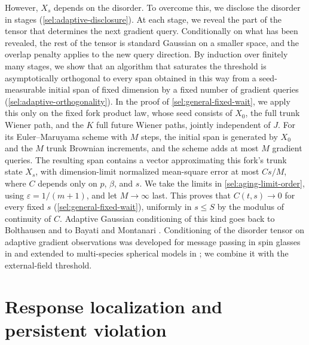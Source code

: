 However, $X_s$ depends on the disorder. To overcome this, we disclose the disorder in stages (\cref{sel:adaptive-disclosure}). At each stage, we reveal the part of the tensor that determines the next gradient query. Conditionally on what has been revealed, the rest of the tensor is standard Gaussian on a smaller space, and the overlap penalty applies to the new query direction. By induction over finitely many stages, we show that an algorithm that saturates the threshold is asymptotically orthogonal to every span obtained in this way from a seed-measurable initial span of fixed dimension by a fixed number of gradient queries (\cref{sel:adaptive-orthogonality}). In the proof of \cref{sel:general-fixed-wait}, we apply this only on the fixed fork product law, whose seed consists of $X_0$, the full trunk Wiener path, and the $K$ full future Wiener paths, jointly independent of $J$. For its Euler--Maruyama scheme with $M$ steps, the initial span is generated by $X_0$ and the $M$ trunk Brownian increments, and the scheme adds at most $M$ gradient queries. The resulting span contains a vector approximating this fork's trunk state $X_s$, with dimension-limit normalized mean-square error at most $Cs/M$, where $C$ depends only on $p$, $\beta$, and $s$. We take the limits in \eqref{sel:aging-limit-order}, using $\varepsilon=1/(m+1)$, and let $M\to\infty$ last. This proves that $C(t,s)\to0$ for every fixed $s$ (\cref{sel:general-fixed-wait}), uniformly in $s\le S$ by the modulus of continuity of $C$. Adaptive Gaussian conditioning of this kind goes back to Bolthausen \cite[Section~3]{bolthausen2014} and to Bayati and Montanari \cite[arXiv version~4, Section~3.8]{bayatimontanari2011}. Conditioning of the disorder tensor on adaptive gradient observations was developed for message passing in spin glasses in \cite[arXiv version~1, Appendix~A]{eams2021} and extended to multi-species spherical models in \cite[Appendix~A]{hs2024amp}; we combine it with the external-field threshold.

\section{Response localization and persistent violation}\label{sec:overview-response}


